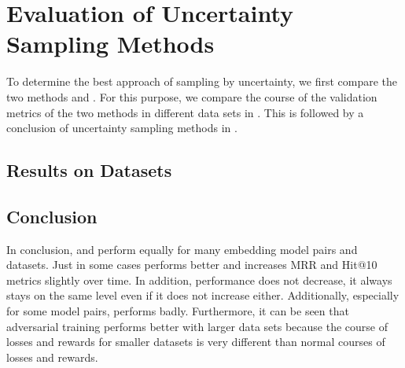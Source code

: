 \section{Evaluation of Uncertainty Sampling Methods}
\label{ch:evaluation:sec:evaluation_methods}
%
To determine the best approach of sampling by uncertainty, we first compare the two methods \usmax and \ussoftmax.
For this purpose, we compare the course of the validation metrics of the two methods in different data sets in .
This is followed by a conclusion of uncertainty sampling methods in  .
%
\subsection{Results on Datasets} \label{subsec:methods_results}








%
\subsection{Conclusion} 
\label{subsec:methods_conclusion}
%
In conclusion, \usmax and \ussoftmax perform equally for many embedding model pairs and datasets.
Just in some cases \ussoftmax performs better and increases MRR and Hit@10 metrics slightly over time.
In addition, performance does not decrease, it always stays on the same level even if it does not increase either.
Additionally, especially for some model pairs, \usmax performs badly.
Furthermore, it can be seen that adversarial training performs better with larger data sets because the course of losses and rewards for smaller datasets is very different than normal courses of losses and rewards.